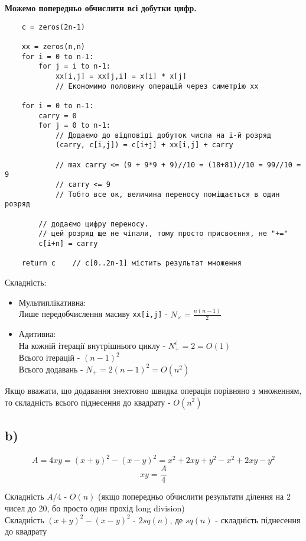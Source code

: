 \documentclass[11pt, a4paper]{article} %
\begin{document}
\textbf{Можемо попередньо обчислити всі добутки цифр.}

\begin{lstlisting}
    c = zeros(2n-1)

    xx = zeros(n,n)
    for i = 0 to n-1:
        for j = i to n-1:
            xx[i,j] = xx[j,i] = x[i] * x[j]
            // Економимо половину операцій через симетрію xx

    for i = 0 to n-1:
        carry = 0
        for j = 0 to n-1:
            // Додаємо до відповіді добуток числа на i-й розряд
            (carry, c[i,j]) = c[i+j] + xx[i,j] + carry

            // max carry <= (9 + 9*9 + 9)//10 = (18+81)//10 = 99//10 = 9
            // carry <= 9
            // Тобто все ок, величина переносу поміщається в один розряд

        // додаємо цифру переносу. 
        // цей розряд ще не чіпали, тому просто присвоєння, не "+="
        c[i+n] = carry

    return c    // c[0..2n-1] містить результат множення
\end{lstlisting}

Складність:
\begin{itemize}
    \item Мультиплікативна:\\
    Лише передобчислення масиву \texttt{xx[i,j]} - $N_{\times} = \frac{n(n-1)}{2}$
    \item Адитивна:\\
    На кожній ітерації внутрішнього циклу - $N^i_{+} = 2 = O(1)$\\
    Всього ітерацій - $(n-1)^2$\\
    Всього додавань - $N_{+} = 2(n-1)^2 = O(n^2)$
\end{itemize}

Якщо вважати, що додавання знехтовно швидка операція порівняно з множенням, 
то складність всього піднесення до квадрату - $O(n^2)$

\subsection*{b)}

$$A = 4 xy = (x+y)^2 - (x-y)^2 = x^2 + 2xy + y^2 - x^2 +2xy - y^2$$
$$xy = \frac{A}{4}$$

Складність $A/4$ - $O(n)$ (якщо попередньо обчислити результати ділення на 2 чисел до 20, бо просто один прохід long division)\\
Складність $(x+y)^2 - (x-y)^2$ - $2sq(n)$, де $sq(n)$ - складність піднесення до квадрату
\end{document}
